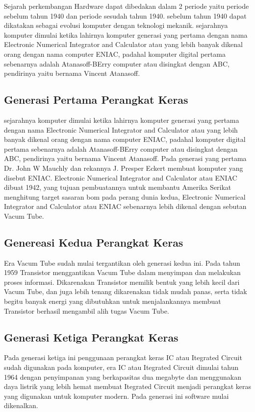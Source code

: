 Sejarah perkembangan Hardware dapat dibedakan dalam 2 periode yaitu periode sebelum tahun 1940 dan periode sesudah tahun 1940. 
sebelum tahun 1940 dapat dikatakan sebagai evolusi komputer dengan teknologi mekanik. sejarahnya komputer dimulai ketika lahirnya 
komputer generasi yang pertama dengan nama Electronic Numerical Integrator and Calculator atau yang lebih banyak dikenal orang dengan 
nama computer ENIAC, padahal komputer digital pertama sebenarnya adalah Atanasoff-BErry computer atau disingkat dengan ABC,
pendirinya yaitu bernama Vincent Atanasoff.
 
\subsection{Generasi Pertama Perangkat Keras}
sejarahnya komputer dimulai ketika lahirnya 
komputer generasi yang pertama dengan nama Electronic Numerical Integrator and Calculator atau yang lebih banyak dikenal orang dengan 
nama computer ENIAC, padahal komputer digital pertama sebenarnya adalah Atanasoff-BErry computer atau disingkat dengan ABC,
pendirinya yaitu bernama Vincent Atanasoff. Pada generasi yang pertama Dr. John W Mauchly dan rekannya J. Presper Eckert membuat 
komputer yang disebut ENIAC. Electronic Numerical Integrator and Calculator atau ENIAC dibuat 1942, yang tujuan pembuatannya untuk
membantu Amerika Serikat menghitung target sasaran bom pada perang dunia kedua, Electronic Numerical Integrator and Calculator atau 
ENIAC sebenarnya lebih dikenal dengan sebutan Vacum Tube.

\subsection{Genereasi Kedua Perangkat Keras}
Era Vacum Tube sudah mulai tergantikan oleh generasi kedua ini. Pada tahun 1959 Transistor menggantikan Vacum Tube dalam
menyimpan dan melakukan proses informasi. Dikarenakan Transistor memilik bentuk yang lebih kecil dari Vacum Tube, dan juga lebih tenang
dikarenakan tidak mudah panas, serta tidak begitu banyak energi yang dibutuhkan untuk menjalankannya membuat Transistor berhasil mengambil
alih tugas Vacum Tube.

\subsection{Generasi Ketiga Perangkat Keras}
Pada generasi ketiga ini penggunaan perangkat keras IC atau Itegrated Circuit sudah digunakan pada komputer, era IC atau Itegrated Circuit
dimulai tahun 1964 dengan penyimpanan yang berkapasitas dua megabyte dan menggunakan daya listrik yang lebih hemat membuat Itegrated Circuit
menjadi perangkat keras yang digunakan untuk komputer modern. Pada generasi ini software mulai dikenalkan.

